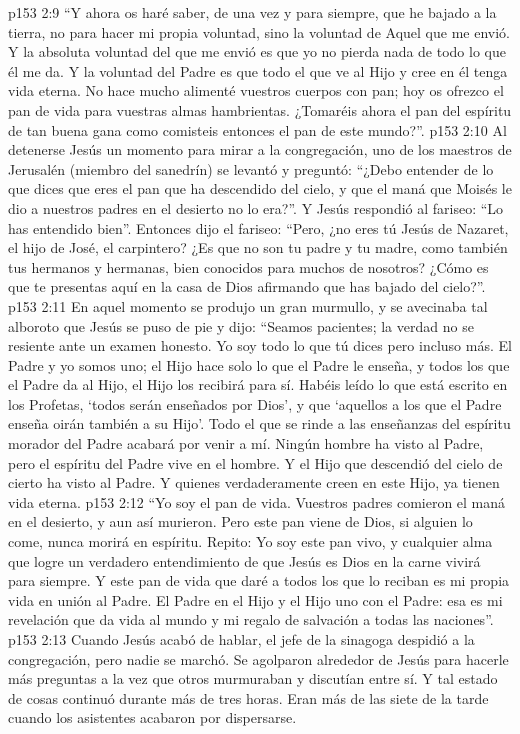 \vs p153 2:9 “Y ahora os haré saber, de una vez y para siempre, que he bajado a la tierra, no para hacer mi propia voluntad, sino la voluntad de Aquel que me envió. Y la absoluta voluntad del que me envió es que yo no pierda nada de todo lo que él me da. Y la voluntad del Padre es que todo el que ve al Hijo y cree en él tenga vida eterna. No hace mucho alimenté vuestros cuerpos con pan; hoy os ofrezco el pan de vida para vuestras almas hambrientas. ¿Tomaréis ahora el pan del espíritu de tan buena gana como comisteis entonces el pan de este mundo?”.
\vs p153 2:10 \pc Al detenerse Jesús un momento para mirar a la congregación, uno de los maestros de Jerusalén (miembro del sanedrín) se levantó y preguntó: “¿Debo entender de lo que dices que eres el pan que ha descendido del cielo, y que el maná que Moisés le dio a nuestros padres en el desierto no lo era?”. Y Jesús respondió al fariseo: “Lo has entendido bien”. Entonces dijo el fariseo: “Pero, ¿no eres tú Jesús de Nazaret, el hijo de José, el carpintero? ¿Es que no son tu padre y tu madre, como también tus hermanos y hermanas, bien conocidos para muchos de nosotros? ¿Cómo es que te presentas aquí en la casa de Dios afirmando que has bajado del cielo?”.
\vs p153 2:11 En aquel momento se produjo un gran murmullo, y se avecinaba tal alboroto que Jesús se puso de pie y dijo: “Seamos pacientes; la verdad no se resiente ante un examen honesto. Yo soy todo lo que tú dices pero incluso más. El Padre y yo somos uno; el Hijo hace solo lo que el Padre le enseña, y todos los que el Padre da al Hijo, el Hijo los recibirá para sí. Habéis leído lo que está escrito en los Profetas, ‘todos serán enseñados por Dios’, y que ‘aquellos a los que el Padre enseña oirán también a su Hijo’. Todo el que se rinde a las enseñanzas del espíritu morador del Padre acabará por venir a mí. Ningún hombre ha visto al Padre, pero el espíritu del Padre vive en el hombre. Y el Hijo que descendió del cielo de cierto ha visto al Padre. Y quienes verdaderamente creen en este Hijo, ya tienen vida eterna.
\vs p153 2:12 “Yo soy el pan de vida. Vuestros padres comieron el maná en el desierto, y aun así murieron. Pero este pan viene de Dios, si alguien lo come, nunca morirá en espíritu. Repito: Yo soy este pan vivo, y cualquier alma que logre un verdadero entendimiento de que Jesús es Dios en la carne vivirá para siempre. Y este pan de vida que daré a todos los que lo reciban es mi propia vida en unión al Padre. El Padre en el Hijo y el Hijo uno con el Padre: esa es mi revelación que da vida al mundo y mi regalo de salvación a todas las naciones”.
\vs p153 2:13 Cuando Jesús acabó de hablar, el jefe de la sinagoga despidió a la congregación, pero nadie se marchó. Se agolparon alrededor de Jesús para hacerle más preguntas a la vez que otros murmuraban y discutían entre sí. Y tal estado de cosas continuó durante más de tres horas. Eran más de las siete de la tarde cuando los asistentes acabaron por dispersarse.
